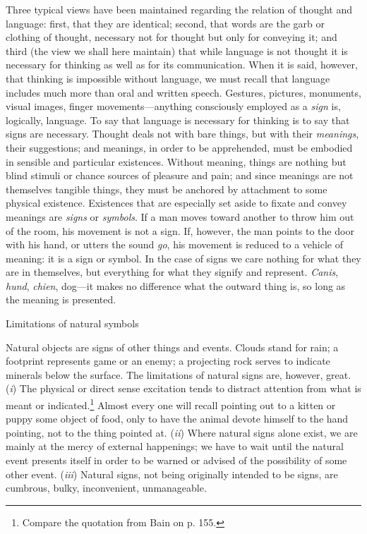 \documentclass[letterpaper]{book}
\begin{document}
Three typical views have been maintained regarding the relation of
thought and language: first, that they are identical; second, that words
are the garb or clothing of thought, necessary not for thought but only
for conveying it; and third (the view we shall here maintain) that while
language is not thought it is necessary for thinking as well as for its
communication. When it is said, however, that thinking is impossible
without language, we must recall that language includes much more than
oral and written speech. Gestures, pictures, monuments, visual images,
finger movements---anything
consciously
employed as a \emph{sign} is, logically, language. To say that language
is necessary for thinking is to say that signs are necessary. Thought
deals not with bare things, but with their \emph{meanings}, their
suggestions; and meanings, in order to be apprehended, must be embodied
in sensible and particular existences. Without meaning, things are
nothing but blind stimuli or chance sources of pleasure and pain; and
since meanings are not themselves tangible things, they must be anchored
by attachment to some physical existence. Existences that are especially
set aside to fixate and convey meanings are \emph{signs} or
\emph{symbols}. If a man moves toward another to throw him out of the
room, his movement is not a sign. If, however, the man points to the
door with his hand, or utters the sound \emph{go}, his movement is
reduced to a vehicle of meaning: it is a sign or symbol. In the case of
signs we care nothing for what they are in themselves, but everything
for what they signify and represent. \emph{Canis}, \emph{hund},
\emph{chien}, dog---it makes no difference what the outward thing is, so
long as the meaning is presented.

Limitations of natural symbols

Natural objects are signs of other things and events. Clouds stand for
rain; a footprint represents game or an enemy; a projecting rock serves
to indicate minerals below the surface. The limitations of natural signs
are, however, great. (\emph{i}) The physical or direct sense excitation
tends to distract attention from what is meant or
indicated.\footnote{ Compare the quotation from Bain on p. 155. }
Almost every one will recall pointing out to a kitten or puppy some
object of food, only to have the animal devote himself to the hand
pointing, not to the thing pointed at. (\emph{ii}) Where natural signs
alone exist, we are mainly at the mercy of external happenings;
we
have to wait until the natural event presents itself in order to be
warned or advised of the possibility of some other event. (\emph{iii})
Natural signs, not being originally intended to be signs, are cumbrous,
bulky, inconvenient, unmanageable.
\end{document}
